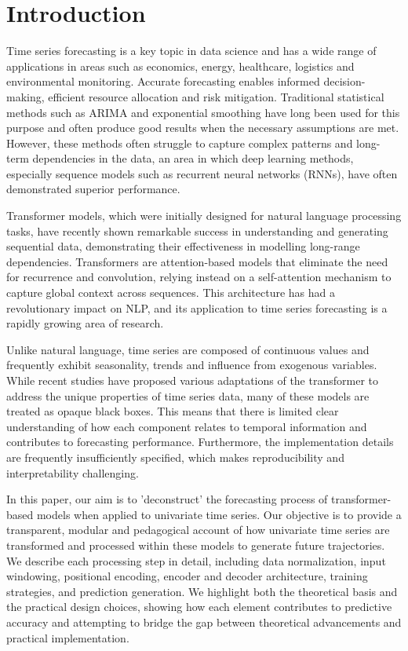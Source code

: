 \documentclass[algorithms,article,submit,pdftex,moreauthors]{Definitions/mdpi}
\begin{document}
\section{Introduction} \label{sec:intro}

Time series forecasting is a key topic in data science and has a wide range of applications in areas such as economics, energy, healthcare, logistics and environmental monitoring. Accurate forecasting enables informed decision-making, efficient resource allocation and risk mitigation. Traditional statistical methods such as ARIMA and exponential smoothing have long been used for this purpose and often produce good results when the necessary assumptions are met. However, these methods often struggle to capture complex patterns and long-term dependencies in the data, an area in which deep learning methods, especially sequence models such as recurrent neural networks (RNNs), have often demonstrated superior performance.

Transformer models, which were initially designed for natural language processing tasks, have recently shown remarkable success in understanding and generating sequential data, demonstrating their effectiveness in modelling long-range dependencies. Transformers are attention-based models that eliminate the need for recurrence and convolution, relying instead on a self-attention mechanism to capture global context across sequences. This architecture has had a revolutionary impact on NLP, and its application to time series forecasting is a rapidly growing area of research. 

Unlike natural language, time series are composed of continuous values and frequently exhibit seasonality, trends and influence from exogenous variables. While recent studies have proposed various adaptations of the transformer to address the unique properties of time series data, many of these models are treated as opaque black boxes. This means that there is limited clear understanding of how each component relates to temporal information and contributes to forecasting performance. Furthermore, the implementation details are frequently insufficiently specified, which makes reproducibility and interpretability challenging.

In this paper, our aim is to 'deconstruct' the forecasting process of transformer-based models when applied to univariate time series. Our objective is to provide a transparent, modular and pedagogical account of how univariate time series are transformed and processed within these models to generate future trajectories. We describe each processing step in detail, including data normalization, input windowing, positional encoding, encoder and decoder architecture, training strategies, and prediction generation. We highlight both the theoretical basis and the practical design choices, showing how each element contributes to predictive accuracy and attempting to bridge the gap between theoretical advancements and practical implementation.
\end{document}
